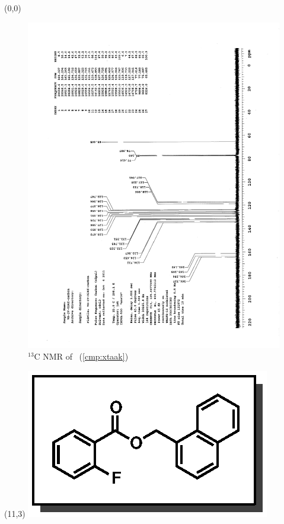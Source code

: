 \clearpage
\begin{textblock}{20}(0,0)
\begin{figure}[htb]
\caption{$^{13}$C NMR of  \CMPxtaak\ (\ref{cmp:xtaak})}
\includegraphics[scale=0.75, trim = 0mm 0mm 0mm 5mm,
clip]{chp_asymmetric/images/nmr/xtaakC}
\vspace{-100pt}
\end{figure}
\end{textblock}
\begin{textblock}{1}(11,3)
\includegraphics[scale=0.8, angle=90]{chp_asymmetric/images/xtaak}
\end{textblock}
